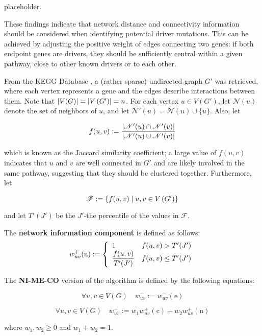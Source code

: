 placeholder. 

These findings indicate that network distance and connectivity information should be considered when identifying potential driver mutations. This can be achieved by adjusting the positive weight of edges connecting two genes: if both endpoint genes are drivers, they should be sufficiently central within a given pathway, close to other known drivers or to each other.

From the KEGG Database \cite{kegg}, a (rather sparse) undirected graph $G'$ was retrieved, where each vertex represents a gene and the edges describe interactions between them. Note that $\abs{V(G)} = \abs{V \left(G' \right)} = n$. For each vertex $u \in V \left(G' \right)$, let $\mathscr{N}(u)$ denote the set of neighbors of $u$, and let $\mathscr{N}'(u) = \mathscr{N}(u) \cup \{u\}$. Also, let

\begin{equation}
    f(u, v) := \dfrac{\abs{\mathscr{N}'(u) \cap \mathscr{N}'(v)}}{\abs{\mathscr{N}'(u) \cup \mathscr{N}'(v)}}
\end{equation}

which is known as the \href{https://en.wikipedia.org/wiki/Jaccard_index}{Jaccard similarity coefficient}; a large value of $f(u, v)$ indicates that $u$ and $v$ are well connected in $G'$ and are likely involved in the same pathway, suggesting that they should be clustered together. Furthermore, let

\begin{equation}
    \mathscr{F} := \{f(u, v) \mid u, v \in V\rbk{G'}\}
\end{equation}

and let $T'(J')$ be the $J'$-the percentile of the values in $\mathscr F$.

\begin{definition}
    The \textbf{network information component} is defined as follows: $$w_{uv}^+(\mathrm n) := \soe{ll}{1 & f(u, v) > T'(J') \\ \dfrac{f(u, v)}{T'(J')} & f(u, v) \le T'(J')}$$
\end{definition}

\begin{definition}[NI-ME-CO]
    The \textbf{NI-ME-CO} version of the algorithm is defined by the following equations:

    \begin{equation}
        \forall u, v \in V(G) \quad w_{uv}^- := w_{uv}^-(\mathrm e)
    \end{equation}

    \begin{equation}
        \forall u, v \in V(G) \quad w_{uv}^+ := w_1 w_{uv}^+(\mathrm c) + w_2 w_{uv}^+(\mathrm n)
    \end{equation}

    where $w_1, w_2 \ge 0$ and $w_1 + w_2 = 1$.
\end{definition}


